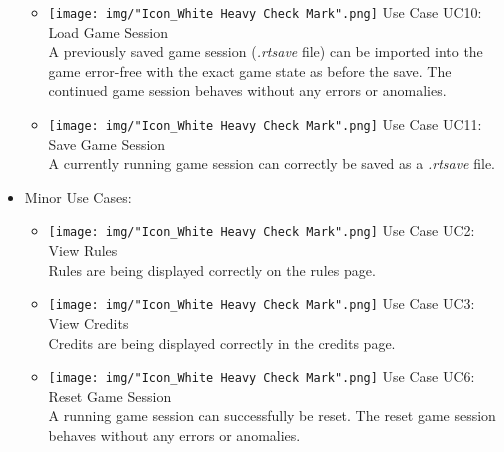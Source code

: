 \begin{itemize}
\begin{itemize}
				\item \texttt{[image: img/"Icon\_White Heavy Check Mark".png]} Use Case UC10: Load Game Session \\
				A previously saved game session (\textit{.rtsave} file) can be imported into the game error-free with the exact game state as before the save. The continued game session behaves without any errors or anomalies.
				\item \texttt{[image: img/"Icon\_White Heavy Check Mark".png]} Use Case UC11: Save Game Session \\
				A currently running game session can correctly be saved as a \textit{.rtsave} file.
			\end{itemize}
			\item Minor Use Cases:
			\begin{itemize}
				\item \texttt{[image: img/"Icon\_White Heavy Check Mark".png]} Use Case UC2: View Rules \\
				Rules are being displayed correctly on the rules page.
				\item \texttt{[image: img/"Icon\_White Heavy Check Mark".png]} Use Case UC3: View Credits \\
				Credits are being displayed correctly in the credits page.
				\item \texttt{[image: img/"Icon\_White Heavy Check Mark".png]} Use Case UC6: Reset Game Session \\
				A running game session can successfully be reset. The reset game session behaves without any errors or anomalies.
			\end{itemize}
		\end{itemize}